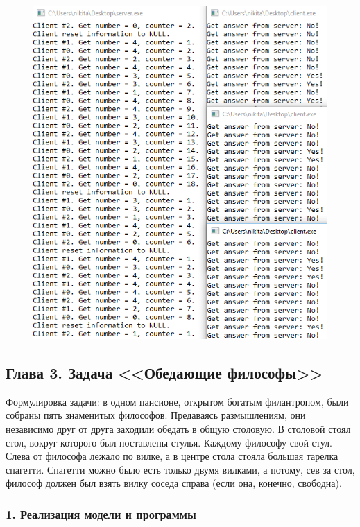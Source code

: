 \documentclass[14pt,a4paper,report]{report}
\begin{document}
\begin{figure}[h!]
	\centering
	\includegraphics[scale = 0.90]{images/p2_5.png}
	
	\caption{}
	\label{image:17}
\end{figure}

\subsection{Глава 3. Задача <<Обедающие философы>>}

Формулировка задачи: в одном пансионе, открытом богатым филантропом, были собраны пять знаменитых философов. Предаваясь размышлениям, они независимо друг от друга заходили обедать в общую столовую. В столовой стоял стол, вокруг которого был поставлены стулья. Каждому философу свой стул. Слева от философа лежало по вилке, а в центре стола стояла большая тарелка спагетти. Спагетти можно было есть только двумя вилками, а потому, сев за стол, философ должен был взять вилку соседа справа (если она, конечно, свободна).

\subsubsection{1. Реализация модели и программы}
\end{document}
